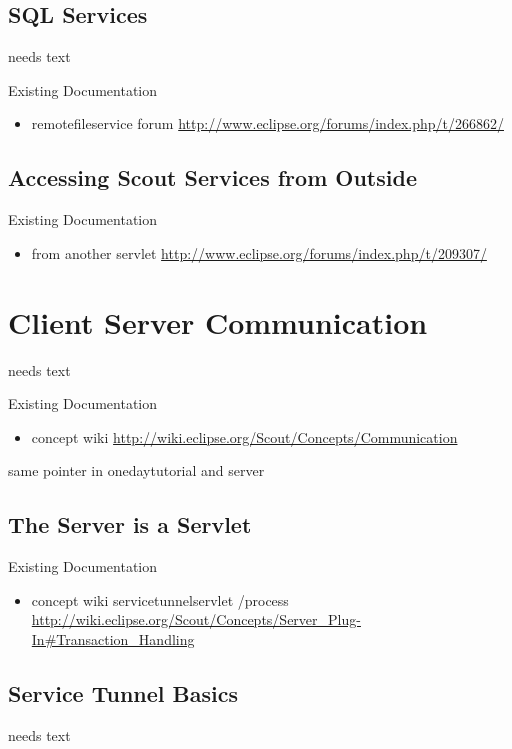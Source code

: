 \documentclass[a4paper,10pt,twoside]{book}
\begin{document}
\subsection{SQL Services}
needs text

\noindent Existing Documentation
\begin{itemize}
  \item remotefileservice forum \url{http://www.eclipse.org/forums/index.php/t/266862/}
\end{itemize}

\subsection{Accessing Scout Services from Outside}

\noindent Existing Documentation
\begin{itemize}
  \item from another servlet \url{http://www.eclipse.org/forums/index.php/t/209307/}
\end{itemize}


\section{Client Server Communication}
needs text

\noindent Existing Documentation
\begin{itemize}
  \item concept wiki \url{http://wiki.eclipse.org/Scout/Concepts/Communication}
\end{itemize}

same pointer in onedaytutorial and server

\subsection{The Server is a Servlet}

\noindent Existing Documentation
\begin{itemize}
  \item concept wiki servicetunnelservlet /process \url{http://wiki.eclipse.org/Scout/Concepts/Server_Plug-In#Transaction_Handling}
\end{itemize}

\subsection{Service Tunnel Basics}
needs text
\end{document}
